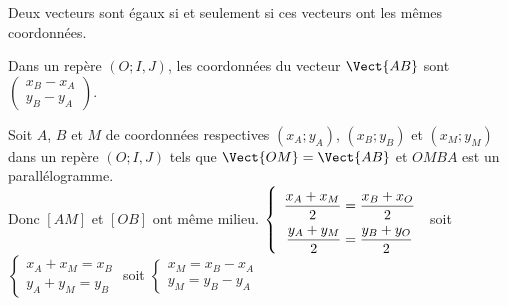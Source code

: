 \documentclass{book}
\begin{document}
\begin{Proposition}
 Deux vecteurs sont égaux si et seulement si ces vecteurs ont les mêmes coordonnées.
\end{Proposition}


\begin{Proposition}
Dans un repère $(O; I,J)$, les  coordonnées du vecteur $\Vect{AB}$ sont $\left( \begin{array}{c} x_B-x_A\\y_B-y_A\end{array}\right)$.
\end{Proposition}

\begin{Demonstration}
 Soit $A$, $B$ et $M$ de coordonnées respectives $(x_A; y_A)$, $(x_B; y_B)$ et $(x_M; y_M)$ dans un repère $(O; I, J)$ tels que $\Vect{OM}=\Vect{AB}$ et $OMBA$ est un parallélogramme.\\
Donc $[AM]$ et $[OB]$ ont même milieu.
    $\renewcommand{\arraystretch}{2}\left \lbrace \begin{array}{c}
                      \dfrac{x_A+x_M}{2}=\dfrac{x_B+x_O}{2}\\
                      \dfrac{y_A+y_M}{2}=\dfrac{y_B+y_O}{2}
                     \end{array} \right.\renewcommand{\arraystretch}{1}
$   soit  $\left \lbrace \begin{array}{c}
                     x_A+x_M=x_B\\
                    y_A+y_M=y_B
                     \end{array} \right.
$ soit $\left \lbrace \begin{array}{c}
                     x_M=x_B-x_A\\
                    y_M=y_B-y_A
                     \end{array} \right.
$
\end{Demonstration}
\end{document}
